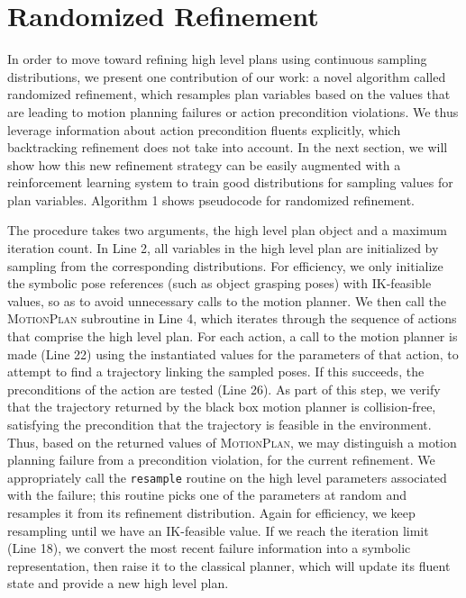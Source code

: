 \section{Randomized Refinement}
In order to move toward refining high level plans using continuous sampling distributions,
we present one contribution of our work: a novel algorithm called randomized refinement, which resamples
plan variables based on the values that are leading to motion planning
failures or action precondition violations. We thus leverage information
about action precondition fluents explicitly, which backtracking refinement
does not take into account. In the next section, we will show how this new refinement strategy
can be easily augmented with a reinforcement learning system to train good
distributions for sampling values for plan variables. Algorithm 1 shows pseudocode
for randomized refinement.

The procedure takes two arguments, the high level plan object and a maximum
iteration count. In Line 2, all variables in the high level plan are initialized by sampling
from the corresponding distributions. For efficiency, we only initialize the symbolic pose
references (such as object grasping poses) with IK-feasible values, so as to avoid unnecessary calls to the
motion planner. We then call the \textsc{MotionPlan} subroutine in Line 4, which
iterates through the sequence of actions that comprise the high level plan.
For each action, a call to the motion planner is made (Line 22) using the instantiated values
for the parameters of that action, to attempt to find a trajectory
linking the sampled poses. If this succeeds, the preconditions of the action
are tested (Line 26). As part of this step, we verify that the trajectory returned by the
black box motion planner is collision-free, satisfying the precondition
that the trajectory is feasible in the environment. Thus, based
on the returned values of \textsc{MotionPlan}, we may distinguish
a motion planning failure from a precondition violation, for the current
refinement. We appropriately call the \texttt{resample} routine on the high level parameters
associated with the failure; this routine picks one of the parameters at random and
resamples it from its refinement distribution. Again for efficiency, we keep resampling until we
have an IK-feasible value. If we reach the iteration limit (Line 18),
we convert the most recent failure information into a symbolic representation, then raise it
to the classical planner, which will update its fluent state and provide a new
high level plan.

